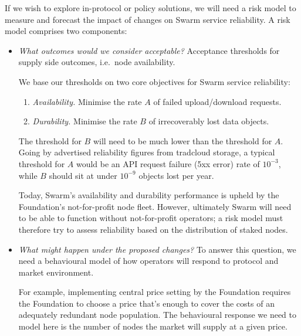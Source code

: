 If we wish to explore in-protocol or policy solutions, we will need a risk model to measure and forecast the impact of changes on Swarm service reliability.
%
A risk model comprises two components:
%
\begin{itemize}
  \item \emph{What outcomes would we consider acceptable?} Acceptance thresholds for supply side outcomes, i.e.~node availability.
   
  We base our thresholds on two core objectives for Swarm service reliability:
  \begin{enumerate}
    \item \emph{Availability.} Minimise the rate $A$ of failed upload/download requests.
    \item \emph{Durability.} Minimise the rate $B$ of irrecoverably lost data objects.
  \end{enumerate}
  The threshold for $B$ will need to be much lower than the threshold for $A$.
  Going by advertised reliability figures from tradcloud storage, a typical threshold for $A$ would be an API request failure (5xx error) rate of $10^{-3}$, while $B$ should sit at under $10^{-9}$ objects lost per year.

  Today, Swarm's availability and durability performance is upheld by the Foundation's not-for-profit node fleet.
  However, ultimately Swarm will need to be able to function without not-for-profit operators; a risk model must therefore try to assess reliability based on the distribution of staked nodes.

  \item \emph{What might happen under the proposed changes?} To answer this question, we need a behavioural model of how operators will respond to protocol and market environment.

  For example, implementing central price setting by the Foundation requires the Foundation to choose a price that's enough to cover the costs of an adequately redundant node population.
  The behavioural response we need to model here is the number of nodes the market will supply at a given price.
    
\end{itemize}